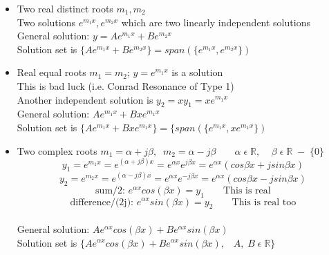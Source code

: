 \documentclass[11pt]{article}
\theoremstyle{definition}
\newcommand{\R}{\mathbb{R}}
\begin{document}
\begin{itemize}[topsep=-10pt]
    \item Two real distinct roots $m_1, m_2$\\
    Two solutions $e^{m_1x}, e^{m_2x}$ which are two linearly independent solutions\\
    General solution: $y = Ae^{m_1x} + Be^{m_2x}$\\
    Solution set is $\{Ae^{m_1x} + Be^{m_2x}\} = span(\{e^{m_1x}, e^{m_2x}\})$ 
    \item Real equal roots $m_1 = m_2$; $y = e^{m_1x}$ is a solution\\
    This is bad luck (i.e. Conrad Resonance of Type 1)\\
    Another independent solution is $y_2 = xy_1 = xe^{m_1x}$\\
    General solution: $Ae^{m_1x} + Bxe^{m_1x}$\\
    Solution set is $\{Ae^{m_1x} + Bxe^{m_1x}\} = \{span(\{e^{m_1x}, xe^{m_1x}\})$
    \item Two complex roots
    $m_1 = \alpha + j\beta ,\;\; m_2 = \alpha - j\beta \;\;\;\;\;\;\; \alpha\; \epsilon\; \R,\;\;\;\; \beta\; \epsilon\; \R\; -\; \{0\}$\\
    $$y_1 = e^{m_1x} = e^{(\alpha + j\beta)x} = e^{\alpha x} e^{j\beta x} = e^{\alpha x} (cos\beta x + j sin \beta x)$$
    $$y_2 = e^{m_2x} = e^{(\alpha - j\beta)x} = e^{\alpha x} e^{-j\beta x} = e^{\alpha x} (cos\beta x - j sin \beta x)$$
    $$\text{sum/2: } e^{\alpha x}cos(\beta x) = y_1\;\;\;\;\;\;\; \text{This is real}$$
    $$\text{difference/(2j): } e^{\alpha x}sin(\beta x) = y_2\;\;\;\;\;\;\; \text{This is real too}$$\\
     General solution: $Ae^{\alpha x}cos(\beta x) + Be^{\alpha x}sin(\beta x)$\\
    Solution set is $\{Ae^{\alpha x}cos(\beta x) + Be^{\alpha x}sin(\beta x), \;\;\; A,\; B\; \epsilon\; \R\}$
\end{itemize}
\end{document}
